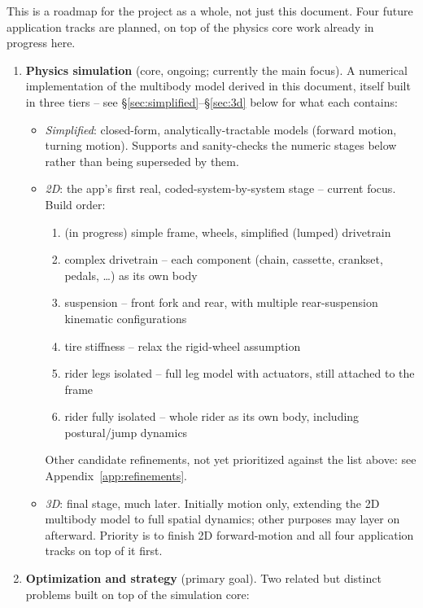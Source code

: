 This is a roadmap for the project as a whole, not just this document. Four future application tracks are planned, on top of the physics core work already in progress here.

\begin{enumerate}
    \item \textbf{Physics simulation} (core, ongoing; currently the main focus). A numerical implementation of the multibody model derived in this document, itself built in three tiers -- see \S\ref{sec:simplified}--\S\ref{sec:3d} below for what each contains:
    \begin{itemize}
        \item \emph{Simplified}: closed-form, analytically-tractable models (forward motion, turning motion). Supports and sanity-checks the numeric stages below rather than being superseded by them.
        \item \emph{2D}: the app's first real, coded-system-by-system stage -- current focus. Build order:
        \begin{enumerate}
            \item (in progress) simple frame, wheels, simplified (lumped) drivetrain
            \item complex drivetrain -- each component (chain, cassette, crankset, pedals, \dots) as its own body
            \item suspension -- front fork and rear, with multiple rear-suspension kinematic configurations
            \item tire stiffness -- relax the rigid-wheel assumption
            \item rider legs isolated -- full leg model with actuators, still attached to the frame
            \item rider fully isolated -- whole rider as its own body, including postural/jump dynamics
        \end{enumerate}
        Other candidate refinements, not yet prioritized against the list above: see Appendix~\ref{app:refinements}.
        \item \emph{3D}: final stage, much later. Initially motion only, extending the 2D multibody model to full spatial dynamics; other purposes may layer on afterward. Priority is to finish 2D forward-motion and all four application tracks on top of it first.
    \end{itemize}
    \item \textbf{Optimization and strategy} (primary goal). Two related but distinct problems built on top of the simulation core:

\end{enumerate}
